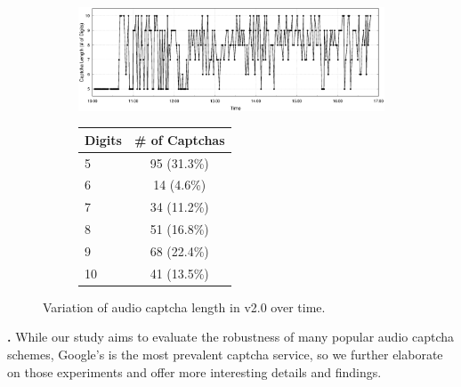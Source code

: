 \begin{figure}[t]
\begin{subfigure}{0.75\textwidth}
    \centering
    \includegraphics[width=1\textwidth]{figures/captcha_length.eps}
    \label{fig:length_time}
\end{subfigure} %
\begin{subfigure}{0.2\textwidth}
    \centering
    \label{tab:length}
    \begin{tabular}{lc}
    \toprule
    \textbf{Digits} & \textbf{\# of Captchas} \\
    \hline
    5 & 95 (31.3\%) \\
    \rowcolor{Gray} 
    6 & 14 (4.6\%) \\
    7 & 34 (11.2\%) \\
    \rowcolor{Gray} 
    8 & 51 (16.8\%) \\
    9 & 68 (22.4\%) \\
    \rowcolor{Gray} 
    10 & 41 (13.5\%)\\
    \bottomrule
    \end{tabular}
\end{subfigure}
\caption{Variation of audio captcha length in \re v2.0 over time.}
\label{fig:length}
\end{figure}

\textbf{\re.} While our study aims to evaluate the robustness of many popular audio captcha schemes,
Google's \re is the most prevalent captcha service, so we further elaborate on those experiments 
and offer more interesting details and findings.

